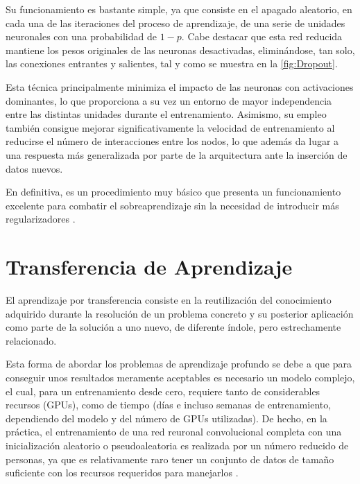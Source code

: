 Su funcionamiento es bastante simple, ya que consiste en el apagado aleatorio, en cada una de las iteraciones del proceso de aprendizaje, de una serie de unidades neuronales con una probabilidad de $1 - p$. Cabe destacar que esta red reducida mantiene los pesos originales de las neuronas desactivadas, eliminándose, tan solo, las conexiones entrantes y salientes, tal y como se muestra en la \autoref{fig:Dropout}.

Esta técnica principalmente minimiza el impacto de las neuronas con activaciones dominantes, lo que proporciona a su vez un entorno de mayor independencia entre las distintas unidades durante el entrenamiento. Asimismo, su empleo también consigue mejorar significativamente la velocidad de entrenamiento al reducirse el número de interacciones entre los nodos, lo que además da lugar a una respuesta más generalizada por parte de la arquitectura ante la inserción de datos nuevos.

En definitiva, es un procedimiento muy básico que presenta un funcionamiento excelente para combatir el sobreaprendizaje sin la necesidad de introducir más regularizadores \cite{CS231n}.

\section{Transferencia de Aprendizaje} \label{Chapter:TransferLearning}

El aprendizaje por transferencia consiste en la reutilización del conocimiento adquirido durante la resolución de un problema concreto y su posterior aplicación como parte de la solución a uno nuevo, de diferente índole, pero estrechamente relacionado.

Esta forma de abordar los problemas de aprendizaje profundo se debe a que para conseguir unos resultados meramente aceptables es necesario un modelo complejo, el cual, para un entrenamiento desde cero, requiere tanto de considerables recursos (GPUs), como de tiempo (días e incluso semanas de entrenamiento, dependiendo del modelo y del número de GPUs utilizadas). De hecho, en la práctica, el entrenamiento de una red reuronal convolucional completa con una inicialización aleatorio o pseudoaleatoria es realizada por un número reducido de personas, ya que es relativamente raro tener un conjunto de datos de tamaño suficiente con los recursos requeridos para manejarlos \cite{CS231n}.  

